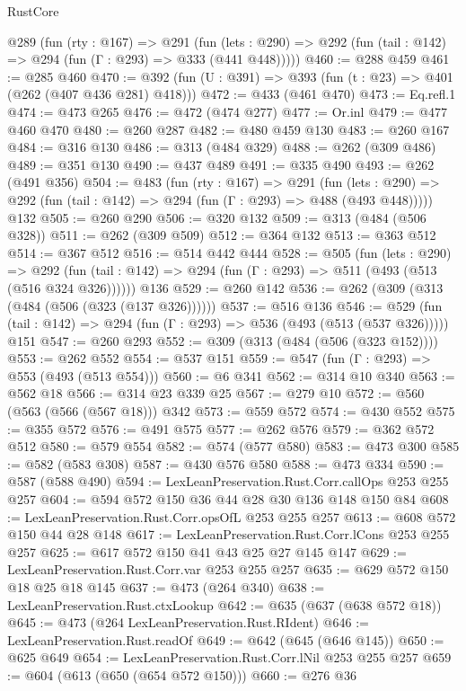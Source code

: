 \begin{lexlean}{RustCore}
\begin{coremodule}
  @289
    (fun (rty : @167) =>
    @291
      (fun (lets : @290) => @292 (fun (tail : @142) => @294 (fun (Γ : @293) => @333 (@441 @448)))))
@460 := @288 @459
@461 := @285 @460
@470 := @392 (fun (U : @391) => @393 (fun (t : @23) => @401 (@262 (@407 @436 @281) @418)))
@472 := @433 (@461 @470)
@473 := Eq.refl.{1}
@474 := @473 @265
@476 := @472 (@474 @277)
@477 := Or.inl
@479 := @477 @460 @470
@480 := @260 @287
@482 := @480 @459 @130
@483 := @260 @167
@484 := @316 @130
@486 := @313 (@484 @329)
@488 := @262 (@309 @486)
@489 := @351 @130
@490 := @437 @489
@491 := @335 @490
@493 := @262 (@491 @356)
@504 := @483
    (fun (rty : @167) =>
    @291
      (fun (lets : @290) => @292 (fun (tail : @142) => @294 (fun (Γ : @293) => @488 (@493 @448)))))
    @132
@505 := @260 @290
@506 := @320 @132
@509 := @313 (@484 (@506 @328))
@511 := @262 (@309 @509)
@512 := @364 @132
@513 := @363 @512
@514 := @367 @512
@516 := @514 @442 @444
@528 := @505
    (fun (lets : @290) =>
    @292 (fun (tail : @142) => @294 (fun (Γ : @293) => @511 (@493 (@513 (@516 @324 @326))))))
    @136
@529 := @260 @142
@536 := @262 (@309 (@313 (@484 (@506 (@323 (@137 @326))))))
@537 := @516 @136
@546 := @529 (fun (tail : @142) => @294 (fun (Γ : @293) => @536 (@493 (@513 (@537 @326))))) @151
@547 := @260 @293
@552 := @309 (@313 (@484 (@506 (@323 @152))))
@553 := @262 @552
@554 := @537 @151
@559 := @547 (fun (Γ : @293) => @553 (@493 (@513 @554)))
@560 := @6 @341
@562 := @314 @10 @340
@563 := @562 @18
@566 := @314 @23 @339 @25
@567 := @279 @10
@572 := @560 (@563 (@566 (@567 @18))) @342
@573 := @559 @572
@574 := @430 @552
@575 := @355 @572
@576 := @491 @575
@577 := @262 @576
@579 := @362 @572 @512
@580 := @579 @554
@582 := @574 (@577 @580)
@583 := @473 @300
@585 := @582 (@583 @308)
@587 := @430 @576 @580
@588 := @473 @334
@590 := @587 (@588 @490)
@594 := LexLeanPreservation.Rust.Corr.callOps @253 @255 @257
@604 := @594 @572 @150 @36 @44 @28 @30 @136 @148 @150 @84
@608 := LexLeanPreservation.Rust.Corr.opsOfL @253 @255 @257
@613 := @608 @572 @150 @44 @28 @148
@617 := LexLeanPreservation.Rust.Corr.lCons @253 @255 @257
@625 := @617 @572 @150 @41 @43 @25 @27 @145 @147
@629 := LexLeanPreservation.Rust.Corr.var @253 @255 @257
@635 := @629 @572 @150 @18 @25 @18 @145
@637 := @473 (@264 @340)
@638 := LexLeanPreservation.Rust.ctxLookup
@642 := @635 (@637 (@638 @572 @18))
@645 := @473 (@264 LexLeanPreservation.Rust.RIdent)
@646 := LexLeanPreservation.Rust.readOf
@649 := @642 (@645 (@646 @145))
@650 := @625 @649
@654 := LexLeanPreservation.Rust.Corr.lNil @253 @255 @257
@659 := @604 (@613 (@650 (@654 @572 @150)))
@660 := @276 @36

\end{coremodule}
\end{lexlean}

